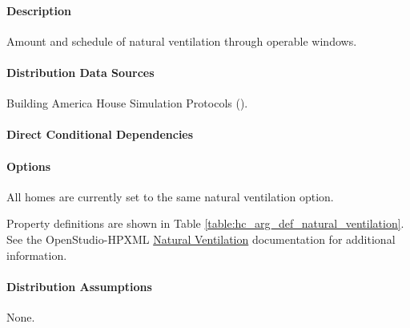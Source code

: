 \paragraph{Description}
% 
Amount and schedule of natural ventilation through operable windows.

\paragraph{Distribution Data Sources}
% 
Building America House Simulation Protocols (\cite{Wilson2014}).

\paragraph{Direct Conditional Dependencies}


\paragraph{Options}
All homes are currently set to the same natural ventilation option.



Property definitions are shown in Table \ref{table:hc_arg_def_natural_ventilation}. See the OpenStudio-HPXML \href{https://openstudio-hpxml.readthedocs.io/en/v1.10.0/workflow_inputs.html#natural-ventilation}{Natural Ventilation} documentation for additional information.



\paragraph{Distribution Assumptions}
% 
None.

